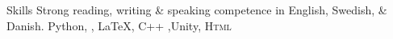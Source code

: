 
\begin{rubric}{Skills}
\entry*[Languages]
	Strong reading, writing \& speaking competence in English, Swedish, \& Danish.
	Python, , \LaTeX, C++ ,Unity, \textsc{Html}
\entry*[Databases]
\end{rubric}
